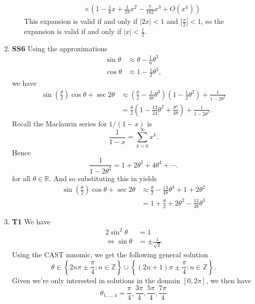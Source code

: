 \documentclass[12pt,oneside]{book}
\begin{document}
\begin{enumerate}
\begin{enumerate}
\begin{align*}
                &\times \left( 1 - \frac{1}{6}x + \frac{1}{18}x^2 - \frac{7}{162}x^3 + O(x^4)  \right)
            \end{align*}
            This expansion is valid if and only if $|2x| < 1$ and $\left| \frac{x}{2} \right| < 1$, so the expansion is valid if and only if $|x| < \frac{1}{2}$.
        \end{enumerate}
        \item \textbf{SS6} Using the approximations \begin{align*}
            \sin \theta &\approx \theta - \frac{1}{6}\theta^3 \\
            \cos \theta &\approx 1 - \frac{1}{2}\theta^2,
        \end{align*}
        we have \begin{align*}
            \sin \left( \frac{\theta}{2} \right) \cos \theta + \sec 2\theta &\approx \left( \frac{\theta}{2} - \frac{1}{48} \theta^3 \right) \left( 1 - \frac{1}{2}\theta^2 \right) + \frac{1}{1-2\theta^2} \\
            &= \frac{\theta}{2} \left( 1- \frac{13}{24} \theta^2 + \frac{\theta^4}{48} \right) + \frac{1}{1-2\theta^2}.
        \end{align*}
        Recall the Maclaurin series for $1/(1-x)$ is \[
            \frac{1}{1-x} = \sum_{k=0}^{\infty} x^k 
        .\] Hence \[
            \frac{1}{1-2\theta^2} = 1 + 2\theta^2 + 4 \theta^4 + \cdots
        .\] for all $\theta \in \mathbb{R}$. And so substituting this in yields \begin{align*}
            \sin \left( \frac{\theta}{2} \right) \cos \theta + \sec 2\theta &\approx \frac{\theta}{2} - \frac{13}{48} \theta^3 + 1 + 2\theta^2 \\
            &= 1 + \frac{\theta}{2} + 2\theta^2 - \frac{13}{48}\theta^3
        \end{align*}
        \item \textbf{T1} We have \begin{align*}
            2\sin^2 \theta &= 1 \\
            \iff \sin \theta &= \pm \frac{1}{\sqrt{2}}
        \end{align*}
        Using the CAST mnomic, we get the following general solution \[
            \theta \in \left\{ 2n\pi \pm \frac{\pi}{4} : n \in \mathbb{Z} \right \} \cup \left\{(2n+1)\pi \pm \frac{\pi}{4} : n \in \mathbb{Z}\right\} 
        .\] Given we're only interested in solutions in the domain $[0, 2\pi]$, we then have \[
            \theta_{1, \ldots, 4} = \frac{\pi}{4}, \frac{3\pi}{4}, \frac{5\pi}{4}, \frac{7\pi}{4}
\]
\end{enumerate}
\end{document}
